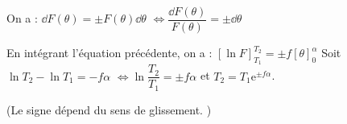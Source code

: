 \ifprof
\begin{corrige}
On a :
 $ \dd F(\theta)= \pm  F\left(\theta\right) \dd \theta $
  $ \Leftrightarrow \dfrac{ \dd F(\theta)}{ F\left(\theta\right)}= \pm \dd \theta $
  
  En intégrant l'équation précédente, on a :
  $\left[ \ln F \right] _{T_1}^{T_2} =\pm f \left[ \theta \right] _{0}^{\alpha}$
  Soit $\ln T_2 - \ln T_1 = -f\alpha$ $\Leftrightarrow \ln \dfrac{T_2}{T_1} = \pm f\alpha$ et $T_2 = T_1 \text{e}^{\pm f\alpha}$.
  
(Le signe dépend du sens de glissement. )
\end{corrige}
\else
\fi

